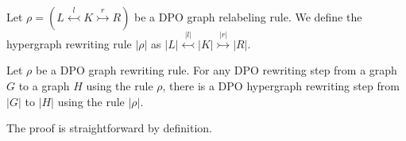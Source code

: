 \begin{definition}
    Let $\rho = (L \overset{l}{\leftarrowtail} K \overset{r}{\rightarrowtail} R)$ be a DPO graph relabeling rule. We define the hypergraph rewriting rule $|\rho|$ as $|L| \overset{|l|}{\leftarrowtail} |K| \overset{|r|}{\rightarrowtail} |R|$. 
\end{definition}


\begin{theorem}
    Let $\rho$ be a DPO graph rewriting rule.
    For any DPO rewriting step from a graph $G$ to a graph $H$ using the rule $\rho$, there is a DPO hypergraph rewriting step from $|G|$ to $|H|$ using the rule $|\rho|$.
\end{theorem}
The proof is straightforward by definition.